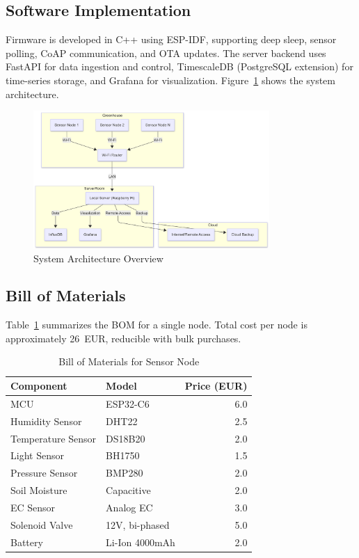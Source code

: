 \documentclass[12pt,a4paper]{article}
\begin{document}
\subsection{Software Implementation}
Firmware is developed in C++ using ESP-IDF, supporting deep sleep, sensor polling, CoAP communication, and OTA updates. The server backend uses FastAPI for data ingestion and control, TimescaleDB (PostgreSQL extension) for time-series storage, and Grafana for visualization. Figure~\ref{fig:arch} shows the system architecture.

\begin{figure}[H]
    \centering
    \includegraphics[width=0.8\textwidth]{images/DeploymentDiagram.png}
    \caption{System Architecture Overview}\label{fig:arch}
\end{figure}

\subsection{Bill of Materials}
Table~\ref{tab:bom} summarizes the BOM for a single node. Total cost per node is approximately 26~EUR, reducible with bulk purchases.

\begin{table}[H]
    \centering
    \caption{Bill of Materials for Sensor Node}
    \begin{tabular}{@{}llr@{}}
    \toprule
    Component & Model & Price (EUR) \\
    \midrule
    MCU & ESP32-C6 & 6.0 \\
    Humidity Sensor & DHT22 & 2.5 \\
    Temperature Sensor & DS18B20 & 2.0 \\
    Light Sensor & BH1750 & 1.5 \\
    Pressure Sensor & BMP280 & 2.0 \\
    Soil Moisture & Capacitive & 2.0 \\
    EC Sensor & Analog EC & 3.0 \\
    Solenoid Valve & 12V, bi-phased & 5.0 \\
    Battery & Li-Ion 4000mAh & 2.0 \\
    \bottomrule
    \end{tabular}\label{tab:bom}
\end{table}
\end{document}
